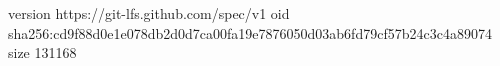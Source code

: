 version https://git-lfs.github.com/spec/v1
oid sha256:cd9f88d0e1e078db2d0d7ca00fa19e7876050d03ab6fd79cf57b24c3c4a89074
size 131168
